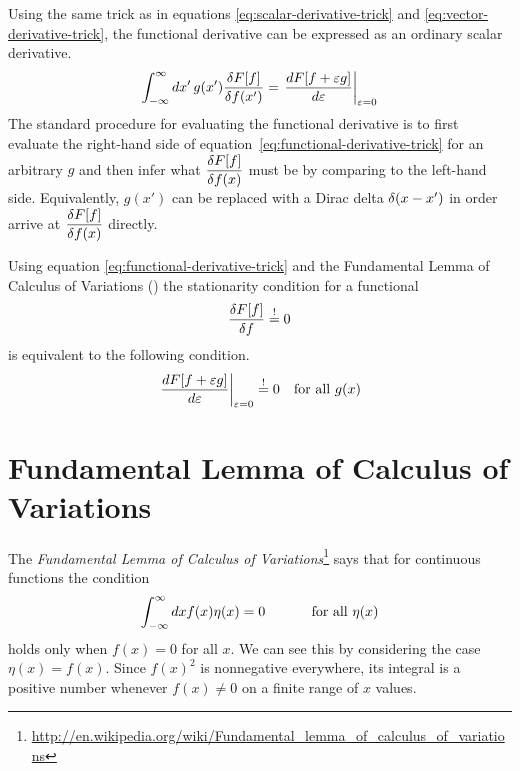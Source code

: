 \documentclass[11pt]{article}
\numberwithin{equation}{section}
\begin{document}
Using the same trick as in equations \ref{eq:scalar-derivative-trick} and \ref{eq:vector-derivative-trick}, the functional derivative can be expressed as an ordinary scalar derivative.
\begin{align}
\label{eq:functional-derivative-trick}
  \int_{-\infty}^{\infty}
  dx'\,
  g(x')
  \fr{\d F[f]}{\d f(x')}
=
  \left.
  \fd{F[f+\e g]}{\e}
  \right|_{\e=0}
\end{align}
The standard procedure for evaluating the functional derivative is to first evaluate the right-hand side of equation~\ref{eq:functional-derivative-trick} for an arbitrary $g$ and then infer what $\dfr{\d F[f]}{\d f(x)}$ must be by comparing to the left-hand side.
Equivalently, $g(x')$ can be replaced with a Dirac delta $\d(x-x')$ in order arrive at $\dfr{\d F[f]}{\d f(x)}$ directly.

Using equation \ref{eq:functional-derivative-trick} and the Fundamental Lemma of Calculus of Variations () the stationarity condition for a functional
\begin{align}
  \fr{\d F[f]}{\d f}
\overset{!}{=}
  0
\end{align}
is equivalent to the following condition.
\begin{align}
  \left.
  \fd{F[f+\e g]}{\e}
  \right|_{\e=0}
\overset{!}{=}
  0
&&
  \text{for all $g(x)$}
\end{align}


\newpage
\section{Fundamental Lemma of Calculus of Variations}\label{app:fundamental-lemma-of-calculus-of-variations}
The \textit{Fundamental Lemma of Calculus of Variations}\footnote{\url{http://en.wikipedia.org/wiki/Fundamental_lemma_of_calculus_of_variations}} says that for continuous functions the condition
\begin{align}
	\int_{-\infty}^\infty dx f(x)\eta(x)
=
	0
\sp\text{ for all $\eta(x)$}
\end{align}
holds only when $f(x)=0$ for all $x$.
We can see this by considering the case $\eta(x)=f(x)$.
Since $f(x)^2$ is nonnegative everywhere, its integral is a positive number whenever $f(x)\neq 0$ on a finite range of $x$ values.
\end{document}
